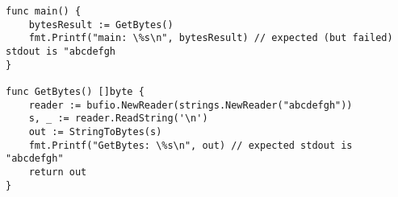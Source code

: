 \begin{lstlisting}[language=Golang, label=lst:escape-analysis-flaw, caption=Escape analysis flaw proof of concept]
func main() {
    bytesResult := GetBytes()
    fmt.Printf("main: \%s\n", bytesResult) // expected (but failed) stdout is "abcdefgh
}

func GetBytes() []byte {
    reader := bufio.NewReader(strings.NewReader("abcdefgh"))
    s, _ := reader.ReadString('\n')
    out := StringToBytes(s)
    fmt.Printf("GetBytes: \%s\n", out) // expected stdout is "abcdefgh"
    return out
}
\end{lstlisting}